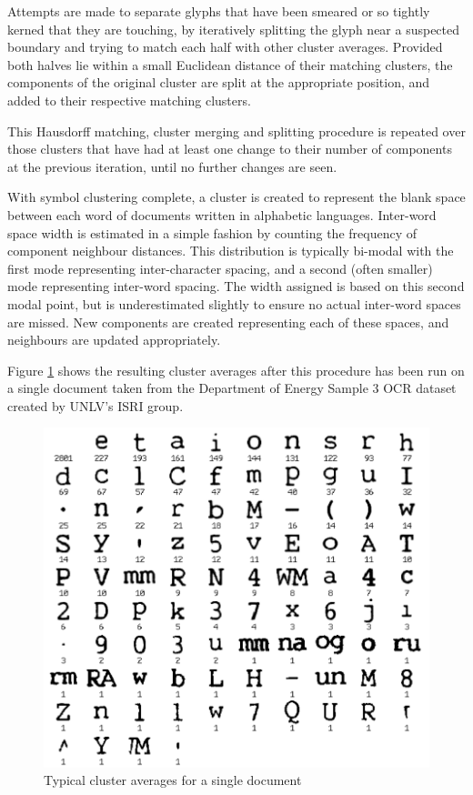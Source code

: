 \documentclass[times, 10pt,twocolumn]{article}
\begin{document}
Attempts are made to separate glyphs that have been smeared or so tightly
kerned that they are touching, by iteratively splitting the glyph near a
suspected boundary and trying to match each half with other cluster averages.
Provided both halves lie within a small Euclidean distance of their matching
clusters, the components of the original cluster are split at the appropriate
position, and added to their respective matching clusters.

This Hausdorff matching, cluster merging and splitting procedure is repeated
over those clusters that have had at least one change to their number of 
components at the previous iteration, until no further changes are seen.

With symbol clustering complete, a cluster is created to represent the blank
space between each word of documents written in alphabetic languages.
Inter-word space width is estimated in a simple fashion by counting the
frequency of component neighbour distances.  This distribution is typically
bi-modal with the first mode representing inter-character spacing, and a second
(often smaller) mode representing inter-word spacing.  The width assigned
is based on this second modal point, but is underestimated slightly to ensure no
actual inter-word spaces are missed.  New components are created representing
each of these spaces, and neighbours are updated appropriately.

Figure \ref{clavg_fig} shows the resulting cluster averages after this
procedure has been run on a single document taken from the Department of Energy
Sample 3 OCR dataset created by UNLV's ISRI group\cite{nartker2005}.

\begin{figure}[ht]
  \centering
  \includegraphics[scale=.5]{figures/cluster_averages}
  \caption{Typical cluster averages for a single document}
  \label{clavg_fig}
\end{figure}
\end{document}
